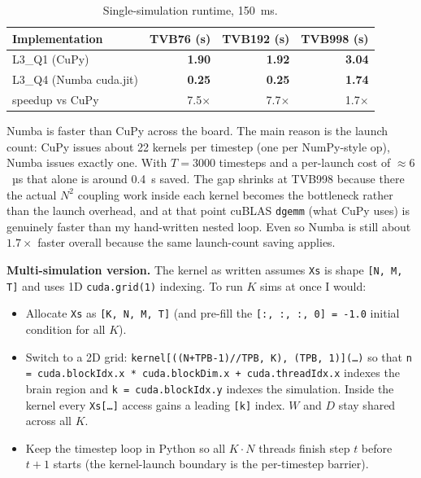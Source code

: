 \documentclass[11pt,a4paper]{article}
\begin{document}
\begin{table}[h]
\centering
\small
\begin{tabular}{lrrr}
\toprule
Implementation & TVB76 (s) & TVB192 (s) & TVB998 (s) \\
\midrule
L3\_Q1 (CuPy)            & \textbf{1.90} & \textbf{1.92} & \textbf{3.04} \\
L3\_Q4 (Numba cuda.jit)  & \textbf{0.25} & \textbf{0.25} & \textbf{1.74} \\
\midrule
speedup vs CuPy          & 7.5$\times$  & 7.7$\times$  & 1.7$\times$ \\
\bottomrule
\end{tabular}
\caption{Single-simulation runtime, 150~ms.}
\end{table}

Numba is faster than CuPy across the board. The main reason is the
launch count: CuPy issues about 22 kernels per timestep (one per
NumPy-style op), Numba issues exactly one. With $T=3000$ timesteps and
a per-launch cost of $\approx 6$~µs that alone is around 0.4~s saved.
The gap shrinks at TVB998 because there the actual $N^2$ coupling work
inside each kernel becomes the bottleneck rather than the launch
overhead, and at that point cuBLAS \texttt{dgemm} (what CuPy uses) is
genuinely faster than my hand-written nested loop. Even so Numba is
still about $1.7\times$ faster overall because the same launch-count
saving applies.

\textbf{Multi-simulation version.} The kernel as written assumes
\texttt{Xs} is shape \texttt{[N, M, T]} and uses 1D \texttt{cuda.grid(1)}
indexing. To run $K$ sims at once I would:

\begin{itemize}
    \item Allocate \texttt{Xs} as \texttt{[K, N, M, T]} (and pre-fill the
    \texttt{[:, :, :, 0] = -1.0} initial condition for all $K$).
    \item Switch to a 2D grid:
    \texttt{kernel[((N+TPB-1)//TPB, K), (TPB, 1)](\dots)} so that
    \texttt{n = cuda.blockIdx.x * cuda.blockDim.x + cuda.threadIdx.x}
    indexes the brain region and \texttt{k = cuda.blockIdx.y} indexes
    the simulation. Inside the kernel every \texttt{Xs[\dots]} access
    gains a leading \texttt{[k]} index. $W$ and $D$ stay shared across
    all $K$.
    \item Keep the timestep loop in Python so all $K\cdot N$ threads
    finish step $t$ before $t+1$ starts (the kernel-launch boundary
    is the per-timestep barrier).
\end{itemize}
\end{document}
